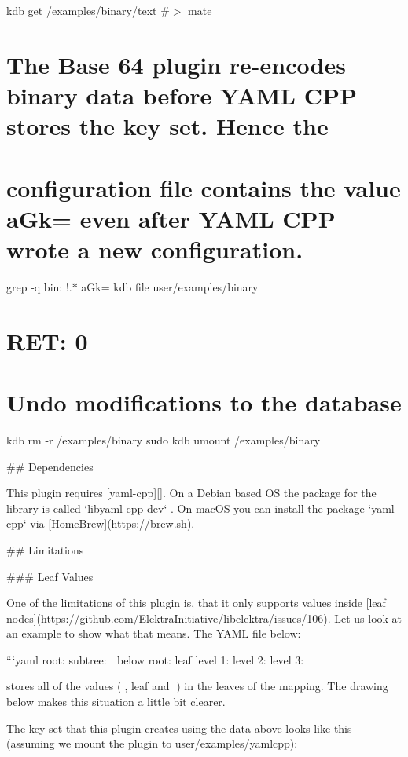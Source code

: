 kdb get /examples/binary/text \#$>$ mate

\section*{The Base 64 plugin re-\/encodes binary data before Y\+A\+ML C\+PP stores the key set. Hence the}

\section*{configuration file contains the value {\ttfamily a\+Gk=} even after Y\+A\+ML C\+PP wrote a new configuration.}

grep -\/q \textquotesingle{}bin\+: !.$\ast$ a\+Gk=\textquotesingle{} {\ttfamily kdb file user/examples/binary} \section*{R\+ET\+: 0}

\section*{Undo modifications to the database}

kdb rm -\/r /examples/binary sudo kdb umount /examples/binary 
\begin{DoxyCode}
## Dependencies

This plugin requires [yaml-cpp][]. On a Debian based OS the package for the library is called
       `libyaml-cpp-dev` . On macOS you can install the package `yaml-cpp` via [HomeBrew](https://brew.sh).

## Limitations

### Leaf Values

One of the limitations of this plugin is, that it only supports values inside [leaf
       nodes](https://github.com/ElektraInitiative/libelektra/issues/106). Let us look at an example to show what that means. The YAML
       file below:

```yaml
root:
  subtree:    🍂
  below root: leaf
level 1:
  level 2:
    level 3:  🍁
\end{DoxyCode}


stores all of the values ({\ttfamily 🍂}, {\ttfamily leaf} and {\ttfamily 🍁}) in the leaves of the mapping. The drawing below makes this situation a little bit clearer.



The key set that this plugin creates using the data above looks like this (assuming we mount the plugin to {\ttfamily user/examples/yamlcpp})\+:


